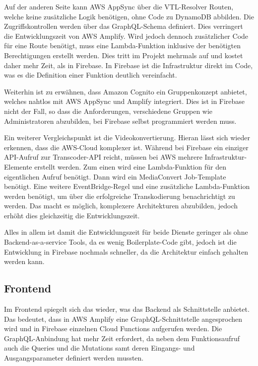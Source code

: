 Auf der anderen Seite kann \ac{AWS} AppSync über die VTL-Resolver Routen, welche keine zusätzliche Logik benötigen, ohne Code zu DynamoDB abbilden. Die Zugriffskontrollen werden über das GraphQL-Schema definiert. Dies verringert die Entwicklungszeit von \ac{AWS} Amplify. Wird jedoch dennoch zusätzlicher Code für eine Route benötigt, muss eine Lambda-Funktion inklusive der benötigten Berechtigungen erstellt werden. Dies tritt im Projekt mehrmals auf und kostet daher mehr Zeit, als in Firebase. In Firebase ist die Infrastruktur direkt im Code, was es die Definition einer Funktion deutlich vereinfacht.

Weiterhin ist zu erwähnen, dass Amazon Cognito ein Gruppenkonzept anbietet, welches nahtlos mit \ac{AWS} AppSync und Amplify integriert. Dies ist in Firebase nicht der Fall, so dass die Anforderungen, verschiedene Gruppen wie Administratoren abzubilden, bei Firebase selbst programmiert werden muss.

Ein weiterer Vergleichspunkt ist die Videokonvertierung. Hieran lässt sich wieder erkennen, dass die \ac{AWS}-Cloud komplexer ist. Während bei Firebase ein einziger API-Aufruf zur Transcoder-API reicht, müssen bei \ac{AWS} mehrere Infrastruktur-Elemente erstellt werden. Zum einen wird eine Lambda-Funktion für den eigentlichen Aufruf benötigt. Dann wird ein MediaConvert Job-Template benötigt. Eine weitere EventBridge-Regel und eine zusätzliche Lambda-Funktion werden benötigt, um über die erfolgreiche Transkodierung benachrichtigt zu werden. Das macht es möglich, komplexere Architekturen abzubilden, jedoch erhöht dies gleichzeitig die Entwicklungszeit.

Alles in allem ist damit die Entwicklungszeit für beide Dienste geringer als ohne Backend-as-a-service Tools, da es wenig Boilerplate-Code gibt, jedoch ist die Entwicklung in Firebase nochmals schneller, da die Architektur einfach gehalten werden kann.

\subsection{Frontend}

Im Frontend spiegelt sich das wieder, was das Backend als Schnittstelle anbietet. Das bedeutet, dass in \ac{AWS} Amplify eine GraphQL-Schnittstelle angesprochen wird und in Firebase einzelnen Cloud Functions aufgerufen werden. Die GraphQL-Anbindung hat mehr Zeit erfordert, da neben dem Funktionsaufruf auch die Queries und die Mutations samt deren Eingangs- und Ausgangsparameter definiert werden mussten.

